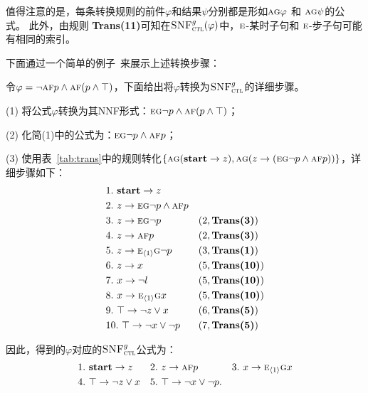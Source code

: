 值得注意的是，每条转换规则的前件$\varphi$和结果$\psi$分别都是形如$\textsc{a}\textsc{g}\varphi$ 和 $\textsc{a}\textsc{g}\psi$的公式。
此外，由规则 \textbf{Trans(11)}可知在${\textsc{SNF}_{\textsc{ctl}}^g}(\varphi)$中，$\textsc{e}$-某时子句和 $\textsc{e}$-步子句可能有相同的索引。


下面通过一个简单的例子~\cite{zhang2014resolution}来展示上述转换步骤：
\begin{example}\label{exmp:transbot}
	令$\varphi=\neg \textsc{a} \textsc{f} p \wedge \textsc{a}\textsc{f}(p \wedge \top)$，下面给出将$\varphi$转换为${\textsc{SNF}_{\textsc{ctl}}^g}$的详细步骤。
	
	(1) 将公式$\varphi$转换为其NNF形式：$\textsc{e}\textsc{g} \neg p \wedge \textsc{a}\textsc{f}(p \wedge \top)$；
	
	(2) 化简(1)中的公式为：$\textsc{e}\textsc{g} \neg p \wedge \textsc{a}\textsc{f} p$；
	
	(3) 使用表~\ref{tab:trans}中的规则转化$\{\textsc{a}\textsc{g}(\textbf{start} \rightarrow z), \textsc{a}\textsc{g}(z \rightarrow (\textsc{e}\textsc{g} \neg p \wedge \textsc{a}\textsc{f} p))\}$，详细步骤如下：
	\begin{align*}
		&1.\ \textbf{start} \rightarrow z && \\
		&2.\ z \rightarrow \textsc{e}\textsc{g} \neg p \wedge \textsc{a}\textsc{f} p &&  \\
		&3.\ z \rightarrow  \textsc{e}\textsc{g} \neg p && (2, \textbf{Trans(3)})\\
		&4.\ z \rightarrow \textsc{a}\textsc{f} p && (2, \textbf{Trans(3)})\\
		&5.\ z \rightarrow  \textsc{e}_{{\langle{1}\rangle}}\textsc{g} \neg p  && (3, \textbf{Trans(1)})\\
		&6.\ z \rightarrow x && (5, \textbf{Trans(10)})\\
		&7.\ x\rightarrow \neg l && (5, \textbf{Trans(10)})\\
		&8.\ x\rightarrow \textsc{e}_{{\langle{1}\rangle}} \textsc{g} x&& (5, \textbf{Trans(10)})\\
		&9.\ \top \rightarrow \neg z \vee x && (6, \textbf{Trans(5)}) \\
		&10.\ \top \rightarrow \neg x \vee \neg p && (7, \textbf{Trans(5)}) 
	\end{align*}

因此，得到的$\varphi$对应的${\textsc{SNF}_{\textsc{ctl}}^g}$公式为：
\begin{align*}
	&1.\ \textbf{start} \rightarrow z && 2.\ z \rightarrow \textsc{a}\textsc{f} p && 3.\ x\rightarrow \textsc{e}_{{\langle{1}\rangle}} \textsc{g} x\\
	&4.\ \top \rightarrow \neg z \vee x && 5.\ \top \rightarrow \neg x \vee \neg p.
\end{align*}
\end{example}






